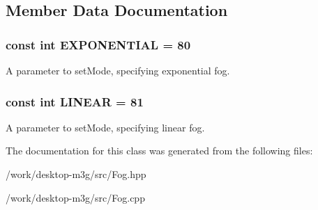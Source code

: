 \subsection{Member Data Documentation}
\hypertarget{classm3g_1_1Fog_86b391da2e58c0448712a10f6609a62c}{
\subsubsection[{EXPONENTIAL}]{\setlength{\rightskip}{0pt plus 5cm}const int {\bf EXPONENTIAL} = 80}}
\label{classm3g_1_1Fog_86b391da2e58c0448712a10f6609a62c}


A parameter to setMode, specifying exponential fog. \hypertarget{classm3g_1_1Fog_23ccf193c67257f1be26417041cecb31}{
\subsubsection[{LINEAR}]{\setlength{\rightskip}{0pt plus 5cm}const int {\bf LINEAR} = 81}}
\label{classm3g_1_1Fog_23ccf193c67257f1be26417041cecb31}


A parameter to setMode, specifying linear fog. 

The documentation for this class was generated from the following files:\begin{CompactItemize}
\item 
/work/desktop-m3g/src/Fog.hpp\item 
/work/desktop-m3g/src/Fog.cpp\end{CompactItemize}
